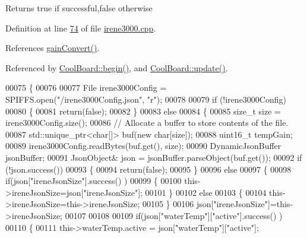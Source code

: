 \begin{DoxyReturn}{Returns}
true if successful,false otherwise 
\end{DoxyReturn}


Definition at line \hyperlink{irene3000_8cpp_source_l00074}{74} of file \hyperlink{irene3000_8cpp_source}{irene3000.\+cpp}.



References \hyperlink{irene3000_8cpp_source_l00391}{gain\+Convert()}.



Referenced by \hyperlink{_cool_board_8cpp_source_l00021}{Cool\+Board\+::begin()}, and \hyperlink{_cool_board_8cpp_source_l00411}{Cool\+Board\+::update()}.


\begin{DoxyCode}
00075 \{
00076 
00077     File irene3000Config = SPIFFS.open(\textcolor{stringliteral}{"/irene3000Config.json"}, \textcolor{stringliteral}{"r"});
00078 
00079     \textcolor{keywordflow}{if} (!irene3000Config) 
00080     \{
00081         \textcolor{keywordflow}{return}(\textcolor{keyword}{false});
00082     \}
00083     \textcolor{keywordflow}{else}
00084     \{
00085         \textcolor{keywordtype}{size\_t} size = irene3000Config.size();
00086         \textcolor{comment}{// Allocate a buffer to store contents of the file.}
00087         std::unique\_ptr<char[]> buf(\textcolor{keyword}{new} \textcolor{keywordtype}{char}[size]);
00088             uint16\_t tempGain;
00089         irene3000Config.readBytes(buf.get(), size);
00090         DynamicJsonBuffer jsonBuffer;
00091         JsonObject& json = jsonBuffer.parseObject(buf.get());
00092         \textcolor{keywordflow}{if} (!json.success()) 
00093         \{
00094               \textcolor{keywordflow}{return}(\textcolor{keyword}{false});
00095         \} 
00096         \textcolor{keywordflow}{else}
00097         \{   
00098             \textcolor{keywordflow}{if}(json[\textcolor{stringliteral}{"ireneJsonSize"}].success() )
00099             \{
00100                 this->ireneJsonSize=json[\textcolor{stringliteral}{"ireneJsonSize"}];
00101             \}
00102             \textcolor{keywordflow}{else}
00103             \{
00104                 this->ireneJsonSize=this->ireneJsonSize;
00105             \}
00106             json[\textcolor{stringliteral}{"ireneJsonSize"}]=this->ireneJsonSize;
00107 
00108             
00109             \textcolor{keywordflow}{if}(json[\textcolor{stringliteral}{"waterTemp"}][\textcolor{stringliteral}{"active"}].success() )
00110             \{           
00111                 this->waterTemp.active = json[\textcolor{stringliteral}{"waterTemp"}][\textcolor{stringliteral}{"active"}]; 

\end{DoxyCode}
